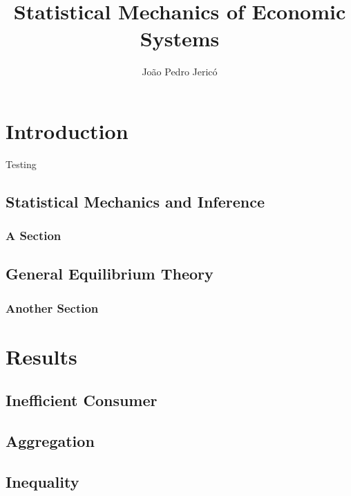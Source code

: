 \documentclass[
  twoside,
  11pt, a4paper,
  footinclude=true,
  headinclude=true,
  cleardoublepage=empty
]{scrbook}
\title{Statistical Mechanics of Economic Systems}
\author{João Pedro Jericó}
\begin{document}
\maketitle







\part{Introduction}

Testing \cite{JaynesBook}

\chapter{Statistical Mechanics and Inference}

\section{A Section}

\chapter{General Equilibrium Theory}



\section{Another Section}


\part{Results}

\chapter{Inefficient Consumer}



\chapter{Aggregation}

\chapter{Inequality}

{}

    
\end{document}
